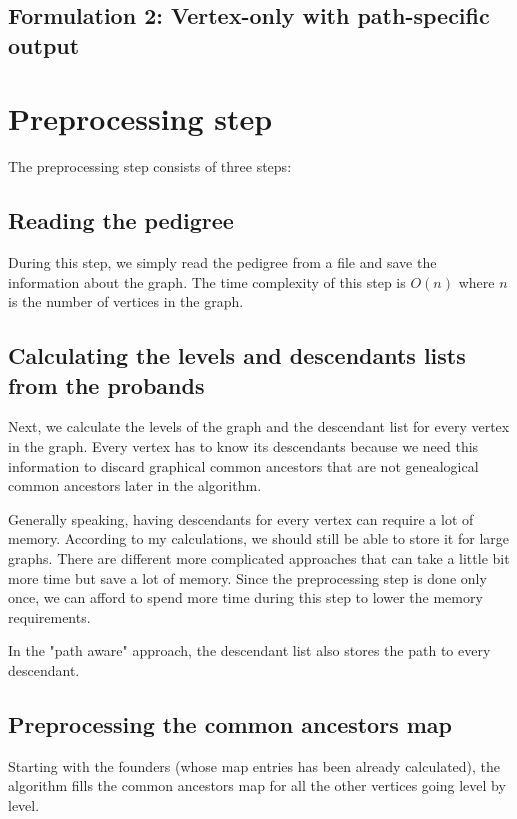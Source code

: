 \documentclass[14pt]{extarticle}
\begin{document}
\subsection{Formulation 2: Vertex-only with path-specific output}

		
\section{Preprocessing step}

The preprocessing step consists of three steps:

\subsection{Reading the pedigree}

During this step, we simply read the pedigree from a file and save the information about the graph. The time complexity of this step is $O(n)$ where $n$ is the number of vertices in the graph.

\subsection{Calculating the levels and descendants lists from the probands}

Next, we calculate the levels of the graph and the descendant list for every vertex in the graph. Every vertex has to know its descendants because we need this information to discard graphical common ancestors that are not genealogical common ancestors later in the algorithm.

Generally speaking, having descendants for every vertex can require a lot of memory. According to my calculations, we should still be able to store it for large graphs. There are different more complicated approaches that can take a little bit more time but save a lot of memory. Since the preprocessing step is done only once, we can afford to spend more time during this step to lower the memory requirements.

In the "path aware" approach, the descendant list also stores the path to every descendant.

\subsection{Preprocessing the common ancestors map}

Starting with the founders (whose map entries has been already calculated), the algorithm fills the common ancestors map for all the other vertices going level by level.
\end{document}
